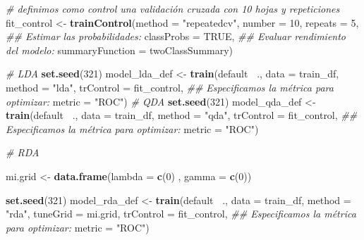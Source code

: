 \documentclass[]{book}
\newenvironment{Shaded}{\begin{snugshade}}{\end{snugshade}}
\newcommand{\CommentTok}[1]{\textcolor[rgb]{0.56,0.35,0.01}{\textit{#1}}}
\newcommand{\DataTypeTok}[1]{\textcolor[rgb]{0.13,0.29,0.53}{#1}}
\newcommand{\DecValTok}[1]{\textcolor[rgb]{0.00,0.00,0.81}{#1}}
\newcommand{\KeywordTok}[1]{\textcolor[rgb]{0.13,0.29,0.53}{\textbf{#1}}}
\newcommand{\NormalTok}[1]{#1}
\newcommand{\OperatorTok}[1]{\textcolor[rgb]{0.81,0.36,0.00}{\textbf{#1}}}
\newcommand{\OtherTok}[1]{\textcolor[rgb]{0.56,0.35,0.01}{#1}}
\newcommand{\StringTok}[1]{\textcolor[rgb]{0.31,0.60,0.02}{#1}}
\begin{document}
\begin{Shaded}
\begin{Highlighting}[]
\CommentTok{# definimos como control una validación cruzada con 10 hojas y repeticiones}
\NormalTok{fit_control <-}\StringTok{ }\KeywordTok{trainControl}\NormalTok{(}\DataTypeTok{method =} \StringTok{"repeatedcv"}\NormalTok{,}
                           \DataTypeTok{number =} \DecValTok{10}\NormalTok{,}
                           \DataTypeTok{repeats =} \DecValTok{5}\NormalTok{,}
                           \CommentTok{## Estimar las probabilidades:}
                           \DataTypeTok{classProbs =} \OtherTok{TRUE}\NormalTok{,}
                           \CommentTok{## Evaluar rendimiento del modelo:}
                           \DataTypeTok{summaryFunction =}\NormalTok{ twoClassSummary)}

\CommentTok{# LDA}
\KeywordTok{set.seed}\NormalTok{(}\DecValTok{321}\NormalTok{)}
\NormalTok{model_lda_def <-}\StringTok{ }\KeywordTok{train}\NormalTok{(default }\OperatorTok{~}\NormalTok{.,}
                       \DataTypeTok{data =}\NormalTok{ train_df,}
                       \DataTypeTok{method =} \StringTok{"lda"}\NormalTok{,}
                       \DataTypeTok{trControl =}\NormalTok{ fit_control,}
                       \CommentTok{## Especificamos la métrica para optimizar:}
                       \DataTypeTok{metric =} \StringTok{"ROC"}\NormalTok{)}
\CommentTok{# QDA}
\KeywordTok{set.seed}\NormalTok{(}\DecValTok{321}\NormalTok{)}
\NormalTok{model_qda_def <-}\StringTok{ }\KeywordTok{train}\NormalTok{(default }\OperatorTok{~}\NormalTok{.,}
                       \DataTypeTok{data =}\NormalTok{ train_df,}
                       \DataTypeTok{method =} \StringTok{"qda"}\NormalTok{,}
                       \DataTypeTok{trControl =}\NormalTok{ fit_control,}
                       \CommentTok{## Especificamos la métrica para optimizar:}
                       \DataTypeTok{metric =} \StringTok{"ROC"}\NormalTok{)}

\CommentTok{# RDA}

\NormalTok{mi.grid <-}\StringTok{ }\KeywordTok{data.frame}\NormalTok{(}\DataTypeTok{lambda =} \KeywordTok{c}\NormalTok{(}\DecValTok{0}\NormalTok{) , }
                       \DataTypeTok{gamma =} \KeywordTok{c}\NormalTok{(}\DecValTok{0}\NormalTok{))}

\KeywordTok{set.seed}\NormalTok{(}\DecValTok{321}\NormalTok{)}
\NormalTok{model_rda_def <-}\StringTok{ }\KeywordTok{train}\NormalTok{(default }\OperatorTok{~}\NormalTok{.,}
                       \DataTypeTok{data =}\NormalTok{ train_df,}
                       \DataTypeTok{method =} \StringTok{"rda"}\NormalTok{,}
                       \DataTypeTok{tuneGrid =}\NormalTok{ mi.grid,}
                       \DataTypeTok{trControl =}\NormalTok{ fit_control,}
                       \CommentTok{## Especificamos la métrica para optimizar:}
                       \DataTypeTok{metric =} \StringTok{"ROC"}\NormalTok{)}


\end{Highlighting}
\end{Shaded}
\end{document}

